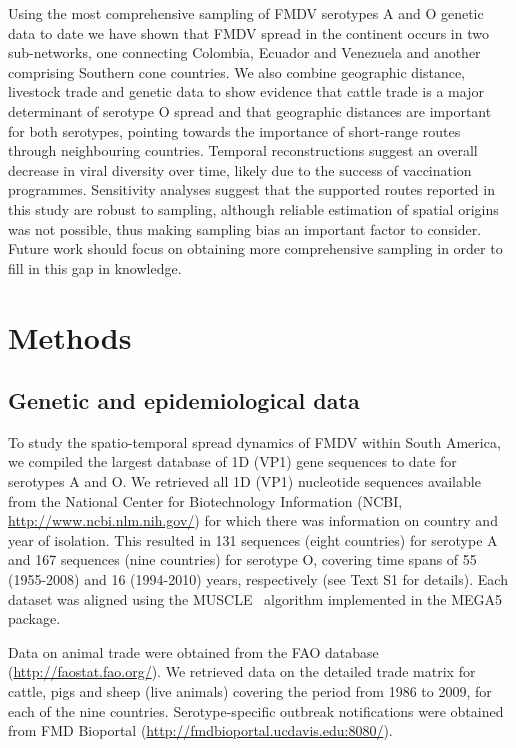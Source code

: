 \documentclass[10pt]{article}
\begin{document}
Using the most comprehensive sampling of FMDV serotypes A and O genetic data to date we have shown that FMDV spread in the continent occurs in two sub-networks, one connecting Colombia, Ecuador and Venezuela and another comprising Southern cone countries.
We also combine geographic distance, livestock trade and genetic data to show evidence that cattle trade is a major determinant of serotype O spread and that geographic distances are important for both serotypes, pointing towards the importance of short-range routes through neighbouring countries.
Temporal reconstructions suggest an overall decrease in viral diversity over time, likely due to the success of vaccination programmes.
Sensitivity analyses suggest that the supported routes reported in this study are robust to sampling, although reliable estimation of spatial origins was not possible, thus making sampling bias an important factor to consider.
Future work should focus on obtaining more comprehensive sampling in order to fill in this gap in knowledge.

\section*{Methods}

\subsection*{Genetic and epidemiological data}

To study the spatio-temporal spread dynamics of FMDV within South America, we compiled the largest database of 1D (VP1) gene sequences to date for serotypes A and O.
We retrieved all 1D (VP1) nucleotide sequences available from the National Center for Biotechnology Information (NCBI, \url{ http://www.ncbi.nlm.nih.gov/}) for which there was information on country and year of isolation.
This resulted in 131 sequences (eight countries) for serotype A and 167 sequences (nine countries) for serotype O, covering time spans of 55 (1955-2008) and 16 (1994-2010) years, respectively (see Text S1 for details).
Each dataset was aligned using the MUSCLE~\cite{muscle} algorithm implemented in the MEGA5~\cite{MEGA} package.

Data on animal trade were obtained from the FAO database (\url{http://faostat.fao.org/}).
We retrieved data on the detailed trade matrix for cattle, pigs and sheep (live animals) covering the period from 1986 to 2009, for each of the nine countries.
Serotype-specific outbreak notifications were obtained from FMD Bioportal (\url{http://fmdbioportal.ucdavis.edu:8080/}).
\end{document}
